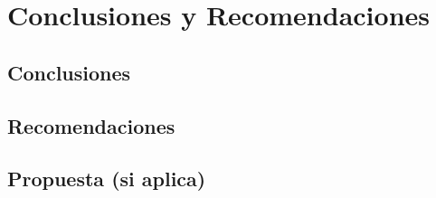 \chapter{Conclusiones y Recomendaciones}
\section{Conclusiones}
\lipsum[25]
\section{Recomendaciones}
\lipsum[26]
\section{Propuesta (si aplica)}
\lipsum[27]
